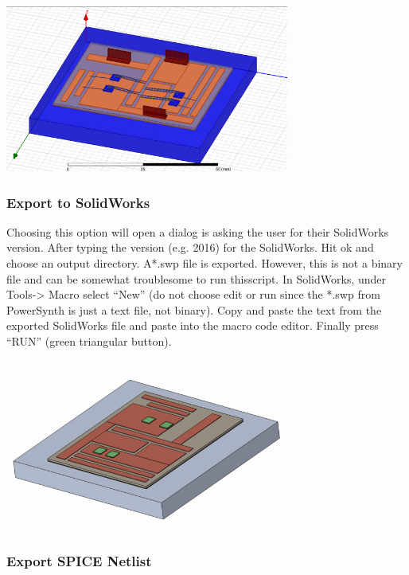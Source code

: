 \documentclass[11pt]{article}
\begin{document}
\begin{center}
\includegraphics[width=0.7\textwidth]{./figs/30_Q3D.png}
\end{center}

\subsubsection{Export to SolidWorks}
\label{sec-2-8-2}

Choosing this option will open a dialog is asking the user for their SolidWorks version. After typing the version (e.g. 2016) for the SolidWorks. Hit ok and choose an output directory. A*.swp file is exported. However, this is not a binary file and can be somewhat troublesome to run thisscript. In SolidWorks, under Tools-> Macro select “New” (do not choose edit or run since the *.swp from PowerSynth is just a text file, not binary). Copy and paste the text from the exported SolidWorks file and paste into the macro code editor. Finally press “RUN” (green triangular button).

\begin{center}
\includegraphics[width=0.7\textwidth]{./figs/31_SolidWorks.png}
\end{center}

\subsubsection{Export SPICE Netlist}
\label{sec-2-8-3}
\end{document}
